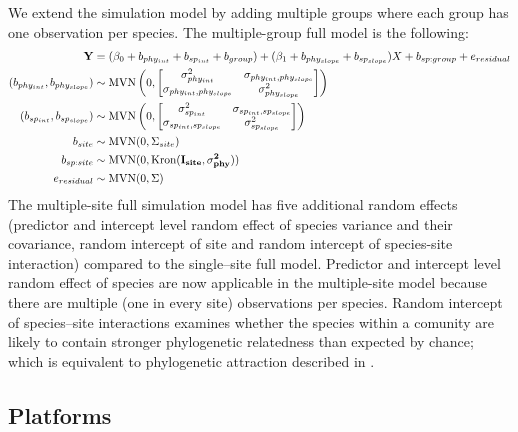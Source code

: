 \documentclass[12pt]{article}
\begin{document}
We extend the simulation model by adding multiple groups where each group has one observation per species. The multiple-group full model is the following: 
\begin{align}
{\mathbf Y} & = (\beta_0 + b_{phy_{int}} + b_{sp_{int}} + b_{group}) + (\beta_1 + b_{phy_{slope}} + b_{sp_{slope}}) X + b_{sp:group} + e_{residual} \label{eq:ms_sim}\\
(b_{phy_{int}}, b_{phy_{slope}}) & \sim \textrm{MVN} \left( 0, \begin{bmatrix}
\sigma^2_{phy_{int}} & \sigma_{phy_{int},phy_{slope}} \\ 
\sigma_{phy_{int},phy_{slope}} & \sigma^2_{phy_{slope}}
\end{bmatrix}
\right) \\
(b_{sp_{int}}, b_{sp_{slope}}) & \sim \textrm{MVN} \left( 0, \begin{bmatrix}
\sigma^2_{sp_{int}} & \sigma_{sp_{int},sp_{slope}} \\ 
\sigma_{sp_{int},sp_{slope}} & \sigma^2_{sp_{slope}}
\end{bmatrix}
\right) \\
b_{site} & \sim \textrm{MVN} ( 0 , \Sigma_{site}) \\
b_{sp:site} & \sim \textrm{MVN} (0, \textrm{Kron}(\bf{I}_{site}, \sigma^2_{phy})) \\
e_{residual} & \sim \textrm{MVN} ( 0 , \Sigma)
\end{align}
The multiple-site full simulation model has five additional random effects (predictor and intercept level random effect of species variance and their covariance, random intercept of site and random intercept of species-site interaction) compared to the single--site full model.
Predictor and intercept level random effect of species are now applicable in the multiple-site model because there are multiple (one in every site) observations per species. 
Random intercept of species--site interactions examines whether the species within a comunity are likely to contain stronger phylogenetic relatedness than expected by chance; which is equivalent to phylogenetic attraction described in \cite{helmus2007separating}. 

\subsection{Platforms}
\end{document}
